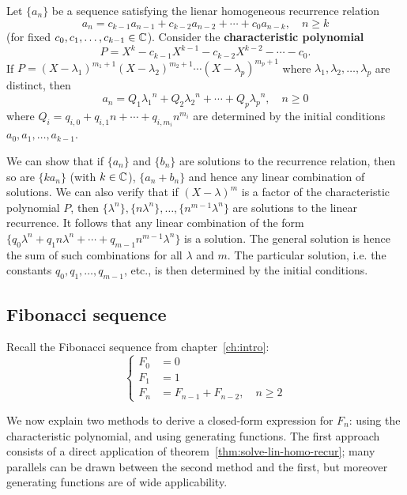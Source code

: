 \documentclass[a4paper, 12pt]{report}
\begin{document}
\begin{thm}\label{thm:solve-lin-homo-recur}
Let $\{a_n\}$ be a sequence satisfying the lienar homogeneous recurrence relation
\[a_n = c_{k - 1} a_{n - 1} + c_{k - 2} a_{n - 2} + \cdots + c_0 a_{n - k}, \quad n \geq k\]
(for fixed $c_0, c_1, \dots, c_{k - 1} \in \mathbb{C}$). Consider the \textbf{characteristic polynomial} 
\[P = X^k - c_{k - 1} X^{k - 1} - c_{k - 2} X^{k - 2} - \cdots - c_0.\]
If $P = (X - \lambda_1)^{m_1 + 1} (X - \lambda_2)^{m_2 + 1} \cdots (X - \lambda_p)^{m_p + 1}$
where $\lambda_1, \lambda_2, \dots, \lambda_p$ are distinct, then 
\[a_n = Q_1 {\lambda_1}^n + Q_2 {\lambda_2}^n + \cdots + Q_p {\lambda_p}^n, \quad n \geq 0\]
where $Q_i = q_{i, 0} + q_{i, 1} n + \cdots + q_{i, m_i} n^{m_i}$ are determined by the initial conditions $a_0, a_1, \dots, a_{k - 1}$.
\end{thm}
\begin{sproof}
We can show that if $\{a_n\}$ and $\{b_n\}$ are solutions to the recurrence relation, then so are $\{k a_n\}$ (with $k \in \mathbb{C}$), $\{a_n + b_n\}$ and hence any linear combination of solutions. We can also verify that if $(X - \lambda)^m$ is a factor of the characteristic polynomial $P$, then $\{\lambda^n\}, \{n \lambda^n\}, \dots, \{n^{m - 1} \lambda^n\}$ are solutions to the linear recurrence. It follows that any linear combination of the form $\{q_0 \lambda^n + q_1 n \lambda^n + \cdots + q_{m - 1} n^{m - 1} \lambda^n\}$ is a solution. The general solution is hence the sum of such combinations for all $\lambda$ and $m$. The particular solution, i.e. the constants $q_0, q_1, \dots, q_{m - 1}$, etc., is then determined by the initial conditions.
\end{sproof}

\subsection{Fibonacci sequence}
Recall the Fibonacci sequence from chapter~\ref{ch:intro}:
\[
\begin{cases}
F_0 &= 0\\
F_1 &= 1\\
F_n &= F_{n - 1} + F_{n - 2}, \quad n \geq 2
\end{cases}
\]

We now explain two methods to derive a closed-form expression for $F_n$: using the characteristic polynomial, and using generating functions. The first approach consists of a direct application of theorem~\ref{thm:solve-lin-homo-recur}; many parallels can be drawn between the second method  and the first, but moreover generating functions are of wide applicability.
\end{document}
